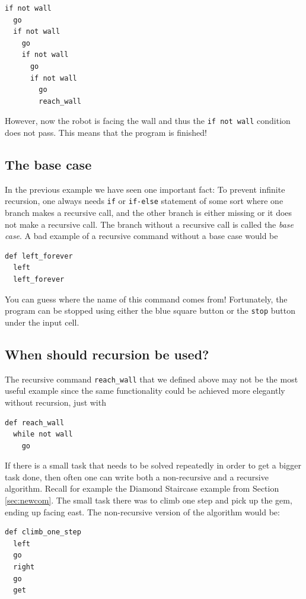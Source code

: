 \documentclass[article,A4,12pt]{llncs}
\begin{document}
{{{{\begin{verbatim}
if not wall
  go
  if not wall
    go
    if not wall
      go
      if not wall
        go
        reach_wall
\end{verbatim}
\noindent
However, now the robot is facing the wall and thus the {\tt if not wall} condition does not pass.  
This means that the program is finished!

\subsection{The base case}

In the previous example we have seen one important fact: To prevent infinite recursion, one always needs {\tt if} or {\tt if-else} 
statement of some sort where one branch makes a recursive call, and the other branch is either 
missing or it does not make a recursive call. The branch without a recursive 
call is called the {\em base case}. A bad example of a recursive command without a base case would be 

\begin{verbatim}
def left_forever
  left
  left_forever
\end{verbatim}
\noindent
You can guess where the name of this command comes from! Fortunately, the program can be stopped using 
either the blue square button or the {\tt stop} button under the input cell.

\subsection{When should recursion be used?}

The recursive command {\tt reach\_wall} that we defined above may not be the most useful example 
since the same functionality could be achieved more elegantly without recursion, just with

\begin{verbatim}
def reach_wall
  while not wall
    go
\end{verbatim}
If there is a small task that needs to be solved repeatedly in order to get a bigger task done,
then often one can write both a non-recursive and a recursive algorithm. Recall for example the Diamond
Staircase example from Section \ref{sec:newcom}. The small task there was to climb one step and pick 
up the gem, ending up facing east. The non-recursive version of the algorithm would be:

\begin{verbatim}
def climb_one_step
  left
  go
  right
  go
  get


\end{verbatim}}}}}
\end{document}
